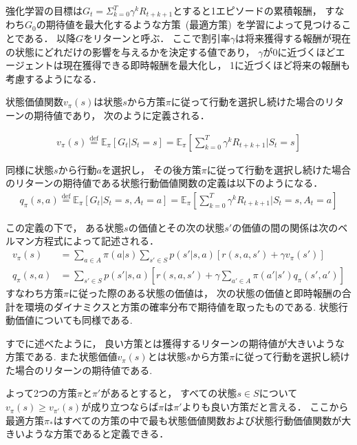 強化学習の目標は$G_t=\Sigma_{k=0}^T \gamma^k R_{t+k+1}$とすると1エピソードの累積報酬， すなわち$G_0$の期待値を最大化するような方策~(最適方策)~を学習によって見つけることである．
以降$G$をリターンと呼ぶ．
ここで割引率$\gamma$は将来獲得する報酬が現在の状態にどれだけの影響を与えるかを決定する値であり， $\gamma$が0に近づくほどエージェントは現在獲得できる即時報酬を最大化し， 1に近づくほど将来の報酬も考慮するようになる．

状態価値関数$v_{\pi}(s)$は状態$s$から方策$\pi$に従って行動を選択し続けた場合のリターンの期待値であり， 次のように定義される．

\begin{align}
  v_{\pi}(s) \stackrel{\mathrm{def}}{=} \mathbb{E}_{\pi}\left[G_t|S_t=s \right] = \mathbb{E}_{\pi}\left[\sum_{k=0}^T \gamma^k R_{t+k+1}|S_t=s \right]
\end{align}

同様に状態$s$から行動$a$を選択し， その後方策$\pi$に従って行動を選択し続けた場合のリターンの期待値である状態行動価値関数の定義は以下のようになる．
\begin{align}
  q_{\pi}(s,a) \stackrel{\mathrm{def}}{=} \mathbb{E}_{\pi}[G_t|S_t=s, A_t=a] = \mathbb{E}_{\pi}\left[\sum_{k=0}^T \gamma^k R_{t+k+1}|S_t=s, A_t=a \right]
\end{align}

この定義の下で， ある状態$s$の価値とその次の状態$s'$の価値の間の関係は次のベルマン方程式によって記述される．
\begin{align}
  v_{\pi}(s) &= \sum_{a \in A} \pi(a|s) \sum_{s' \in S} p(s'|s,a)[r(s,a,s') + \gamma v_{\pi}(s')] \\
  q_{\pi}(s,a) &= \sum_{s' \in S} p(s'|s,a)\left[r(s,a,s') + \gamma \sum_{a' \in A} \pi(a'|s')q_{\pi}(s',a')\right]
\end{align}
すなわち方策$\pi$に従った際のある状態の価値は， 次の状態の価値と即時報酬の合計を環境のダイナミクスと方策の確率分布で期待値を取ったものである. 
状態行動価値についても同様である.

すでに述べたように， 良い方策とは獲得するリターンの期待値が大きいような方策である.
また状態価値$v_\pi(s)$とは状態$s$から方策$\pi$に従って行動を選択し続けた場合のリターンの期待値である.

よって2つの方策$\pi$と$\pi'$があるとすると， すべての状態$s \in S$について$v_\pi(s) \geq v_{\pi'}(s)$が成り立つならば$\pi$は$\pi'$よりも良い方策だと言える．
ここから最適方策$\pi_*$はすべての方策の中で最も状態価値関数および状態行動価値関数が大きいような方策であると定義できる．

